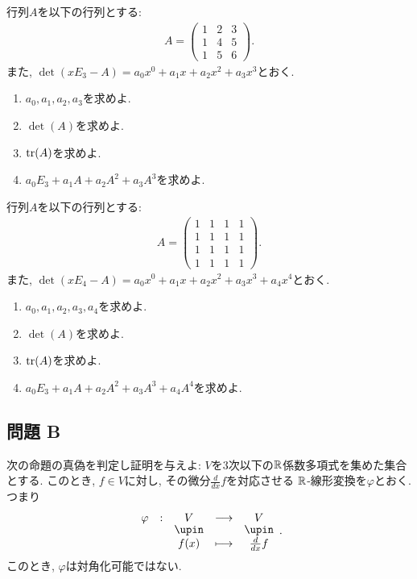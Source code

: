 \begin{quiz}
  行列$A$を以下の行列とする:
  \begin{align*}
    A=\begin{pmatrix}1&2&3\\1&4&5\\1&5&6\end{pmatrix}.
  \end{align*}
  また,
  $\det(xE_3-A)=a_0x^0+a_1x+a_2x^2+a_3x^3$とおく.
  \begin{enumerate}
  \item $a_0,a_1,a_2,a_3$を求めよ.
  \item $\det(A)$を求めよ.
  \item $\operatorname{tr}(A)$を求めよ.
  \item $a_0E_3+a_1A+a_2A^2+a_3A^3$を求めよ.
  \end{enumerate}
\end{quiz}

\begin{quiz}
  行列$A$を以下の行列とする:
  \begin{align*}
    A=\begin{pmatrix}1&1&1&1\\1&1&1&1\\1&1&1&1\\1&1&1&1\end{pmatrix}.
  \end{align*}
  また,
  $\det(xE_4-A)=a_0x^0+a_1x+a_2x^2+a_3x^3+a_4x^4$とおく.
  \begin{enumerate}
  \item $a_0,a_1,a_2,a_3,a_4$を求めよ.
  \item $\det(A)$を求めよ.
  \item $\operatorname{tr}(A)$を求めよ.
  \item $a_0E_3+a_1A+a_2A^2+a_3A^3+a_4A^4$を求めよ.
  \end{enumerate}
\end{quiz}

\subsection{問題 B}
\begin{quiz}
  次の命題の真偽を判定し証明を与えよ:
  $V$を$3$次以下の$\mathbb{R}$係数多項式を集めた集合とする.
  このとき,
  $f\in V$に対し, その微分$\frac{d}{dx}f$を対応させる
  $\mathbb{R}$-線形変換を$\varphi$とおく. つまり
  \begin{align*}
    \shazo{\varphi}{V}{V}
    {f(x)}{\frac{d}{dx}f}.
  \end{align*}
  このとき,
  $\varphi$は対角化可能ではない.
\end{quiz}

